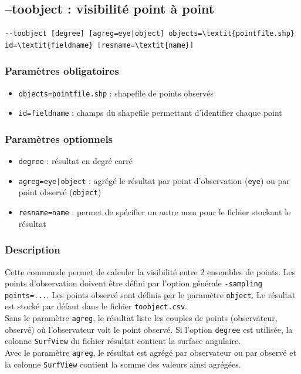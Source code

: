 \documentclass{report}
\begin{document}
\subsection{--toobject : visibilité point à point}
\begin{Verbatim}[commandchars=\\\{\}]
--toobject [degree] [agreg=eye|object] objects=\textit{pointfile.shp} id=\textit{fieldname} [resname=\textit{name}]
\end{Verbatim}

\subsubsection{Paramètres obligatoires}
\begin{itemize}
	\item \verb|objects=pointfile.shp| : shapefile de points observés
	\item \verb|id=fieldname| : champs du shapefile permettant d'identifier chaque point
\end{itemize}

\subsubsection{Paramètres optionnels}
\begin{itemize}
	\item \verb|degree| : résultat en degré carré
	\item \verb/agreg=eye|object/ : agrégé le résultat par point d'observation (\verb|eye|) ou par point observé (\verb|object|)
	\item \verb|resname=name| : permet de spécifier un autre nom pour le fichier stockant le résultat	
\end{itemize}

\subsubsection{Description}
Cette commande permet de calculer la visibilité entre 2 ensembles de points. Les points d'observation doivent être défini par l'option générale \verb|-sampling points=...|. Les points observé sont définis par le paramètre \verb|object|. Le résultat est stocké par défaut dans le fichier \verb|toobject.csv|.\\
Sans le paramètre \verb|agreg|, le résultat liste les couples de points (observateur, observé) où l'observateur voit le point observé. Si l'option \verb|degree| est utilisée, la colonne \verb|SurfView| du fichier résultat contient la surface angulaire.\\
Avec le paramètre \verb|agreg|, le résultat est agrégé par observateur ou par observé et la colonne \verb|SurfView| contient la somme des valeurs ainsi agrégées.
\end{document}
